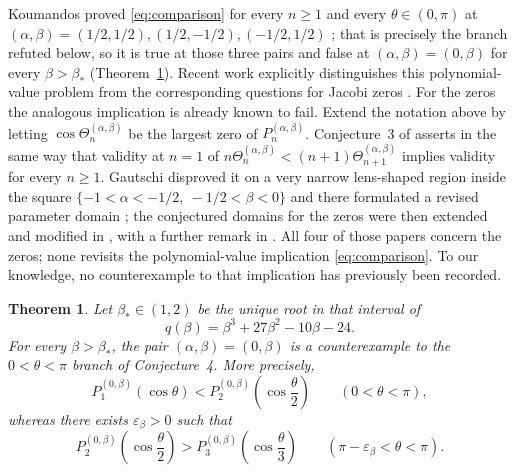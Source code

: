 \documentclass[11pt]{amsart}
\newtheorem{theorem}{Theorem}
\theoremstyle{remark}
\begin{document}
Koumandos proved \eqref{eq:comparison} for every $n\ge1$ and every
$\theta\in(0,\pi)$ at
$(\alpha,\beta)=(1/2,1/2),(1/2,-1/2),(-1/2,1/2)$ \cite{Koumandos};
that is precisely the branch refuted below, so it is true at those
three pairs and false at $(\alpha,\beta)=(0,\beta)$ for every
$\beta>\beta_*$ (Theorem~\ref{thm:family}). Recent work explicitly
distinguishes this polynomial-value problem from the corresponding
questions for Jacobi zeros
\cite[Section~1]{CastilloRafaeli}. For the zeros the analogous
implication is already known to fail. Extend the notation above by
letting $\cos\Theta_n^{(\alpha,\beta)}$ be the largest zero of
$P_n^{(\alpha,\beta)}$. Conjecture~3 of \cite{GautschiLeopardi}
asserts in the same way that validity at $n=1$ of
$n\Theta_n^{(\alpha,\beta)}<(n+1)\Theta_{n+1}^{(\alpha,\beta)}$
implies validity for every $n\ge1$. Gautschi disproved it on a very
narrow lens-shaped region inside the square
$\{-1<\alpha<-1/2,\ -1/2<\beta<0\}$ and there formulated a revised
parameter domain \cite{Gautschi2008}; the conjectured domains for the
zeros were then extended and modified in
\cite{Gautschi2009a,Gautschi2009b}, with a further remark in
\cite{Gautschi2011}. All four of those papers concern the zeros; none
revisits the polynomial-value implication \eqref{eq:comparison}. To
our knowledge, no counterexample to that implication has previously
been recorded.

\begin{theorem}\label{thm:family}
Let $\beta_*\in(1,2)$ be the unique root in that interval of
\[
q(\beta)=\beta^3+27\beta^2-10\beta-24.
\]
For every $\beta>\beta_*$, the pair $(\alpha,\beta)=(0,\beta)$ is a
counterexample to the $0<\theta<\pi$ branch of Conjecture~4. More
precisely,
\[
P_1^{(0,\beta)}(\cos\theta)
<
P_2^{(0,\beta)}\!\left(\cos\frac{\theta}{2}\right)
\qquad (0<\theta<\pi),
\]
whereas there exists $\varepsilon_\beta>0$ such that
\[
P_2^{(0,\beta)}\!\left(\cos\frac{\theta}{2}\right)
>
P_3^{(0,\beta)}\!\left(\cos\frac{\theta}{3}\right)
\qquad (\pi-\varepsilon_\beta<\theta<\pi).
\]
\end{theorem}
\end{document}
